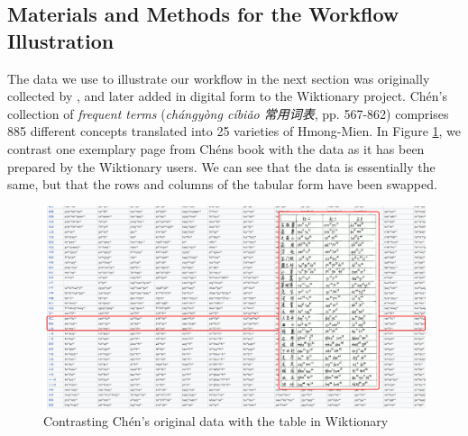 \documentclass[xetex]{scrartcl}
\begin{document}
\subsection{Materials and Methods for the Workflow Illustration}

The data we use to illustrate our workflow in the next section was originally collected by
\citet{Chen2012}, and later added in digital form to the Wiktionary project. Chén's collection of
\emph{frequent terms} (\emph{chángyòng cíbiǎo 常用词表}, pp. 567-862) comprises 885 different
concepts translated into 25 varieties of Hmong-Mien. In Figure \ref{fig:data}, we contrast one
exemplary page from Chéns book with the data as it has been prepared by the Wiktionary users.
We can see that the data is essentially the same, but that the rows and columns of the tabular form
have been swapped.

\begin{figure}[htb]
  \centering
  \includegraphics[width=\textwidth]{chen-illustration.pdf}
  \caption{Contrasting Chén's original data with the table in Wiktionary}
  \label{fig:data}
\end{figure}
\end{document}
